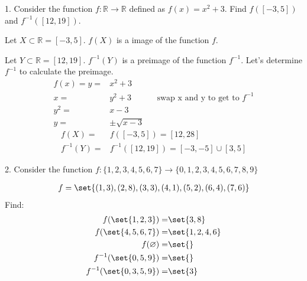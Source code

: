\documentclass{hippoidC}
\begin{document}
\toc
\thispagestyle{styleTOC}
\pagebreak
\pagestyle{styleE}

\begin{prooflist}{1. Consider the function $f: \mathbb{R} \rightarrow \mathbb{R}$ defined as $f(x)=x^2+3$. Find $f([-3,5])$ and $f^{-1}([12,19])$.}
\item \imagedef{}
\item Let $X\subset \mathbb{R}= [-3,5]$. $f(X)$ is a image of the function $f$.
\item Let $Y\subset \mathbb{R}= [12,19]$. $f^{-1}(Y)$ is a preimage of the
    function $f^{-1}$.
Let's determine $f^{-1}$ to calculate the preimage.
\begin{align*}
    f(x) = y =& x^2+3\\
    x=&y^2+3&&\text{swap x and y to get to }f^{-1}\\
    y^2=&x-3\\
    y=&\pm\sqrt{x-3}
\end{align*}
\begin{align*}
    f(X) =& f([-3, 5]) = [12, 28]\\
    f^{-1}(Y) =& f^{-1}([12, 19]) = [-3, -5] \cup [3, 5]
\end{align*}
\end{prooflist}


\begin{prooflist}{2. Consider the function $f:\{1,2,3,4,5,6,7\} \rightarrow\{0,1,2,3,4,5,6,7,8,9\}$ }
\item \imagedef{}
\begin{align*}
f=\set{(1,3),(2,8),(3,3),(4,1),(5,2),(6,4),(7,6)}
\end{align*}
Find:
\begin{align*}
    f(\set{1,2,3})=& \set {3, 8} \\
    f(\set{4,5,6,7}) =& \set{1, 2, 4, 6}\\
    f(\varnothing) =& \set{} \\
    f^{-1}(\set{0,5,9}) =& \set{}\\
    f^{-1}(\set{0,3,5,9}) =& \set{3}\\
\end{align*}
\end{prooflist}
\end{document}
